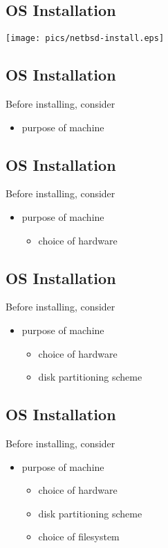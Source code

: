 \documentclass[xga]{xdvislides}
\begin{document}
\subsection{OS Installation}
\begin{center}
	\texttt{[image: pics/netbsd-install.eps]}
\end{center}

\subsection{OS Installation}
Before installing, consider
\begin{itemize}
	\item purpose of machine
\end{itemize}

\subsection{OS Installation}
Before installing, consider
\begin{itemize}
	\item purpose of machine
		\begin{itemize}
			\item choice of hardware
		\end{itemize}
\end{itemize}

\subsection{OS Installation}
Before installing, consider
\begin{itemize}
	\item purpose of machine
		\begin{itemize}
			\item choice of hardware
			\item disk partitioning scheme
		\end{itemize}
\end{itemize}

\subsection{OS Installation}
Before installing, consider
\begin{itemize}
	\item purpose of machine
		\begin{itemize}
			\item choice of hardware
			\item disk partitioning scheme
			\item choice of filesystem
		\end{itemize}
\end{itemize}
\end{document}
